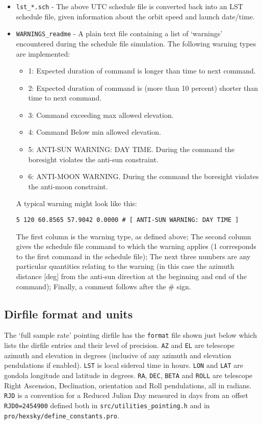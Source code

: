 \documentclass[a4paper,10pt]{article}
\begin{document}
\begin{itemize}
\item \texttt{lst\_*.sch} - The above UTC schedule file is converted
back into an LST schedule file, given information about the orbit
speed and launch date/time.

\item \texttt{WARNINGS\_readme} - A plain text file containing a list
  of `warnings' encountered during the schedule file simulation. The
  following warning types are implemented:
  \begin{itemize}
  \item 1: Expected duration of command is longer than time to next command.
  \item 2: Expected duration of command is (more than 10 percent) shorter than time to next command.
  \item 3: Command exceeding max allowed elevation.
  \item 4: Command Below min allowed elevation.
  \item 5: ANTI-SUN WARNING: DAY TIME. During the command the boresight violates the anti-sun constraint.
  \item 6: ANTI-MOON WARNING. During the command the boresight violates the anti-moon constraint.
  \end{itemize}

  A typical warning might look like this:

\texttt{5 120 60.8565 57.9042 0.0000 \#  [ ANTI-SUN WARNING: DAY TIME ]}

The first column is the warning type, as defined above; The second
column gives the schedule file command to which the warning applies (1
corresponds to the first command in the schedule file); The next three
numbers are any particular quantities relating to the warning (in this
case the azimuth distance [deg] from the anti-sun direction at the
beginning and end of the command); Finally, a comment follows after
the \# sign.

\end{itemize}

\subsection{Dirfile format and units}

The `full sample rate' pointing dirfile has the \texttt{format} file
shown just below which lists the dirfile entries and their level of
precision. \texttt{AZ} and \texttt{EL} are telescope azimuth and
elevation in degrees (inclusive of any azimuth and elevation
pendulations if enabled). \texttt{LST} is local sidereal time in
hours. \texttt{LON} and \texttt{LAT} are gondola longitude and
latitude in degrees. \texttt{RA}, \texttt{DEC}, \texttt{BETA} and
\texttt{ROLL} are telescope Right Ascension, Declination, orientation
and Roll pendulations, all in radians. \texttt{RJD} is a convention
for a Reduced Julian Day measured in days from an offset
\texttt{RJD0=2454900} defined both in
\texttt{src/utilities\_pointing.h} and in
\texttt{pro/hexsky/define\_constants.pro}.
\end{document}
